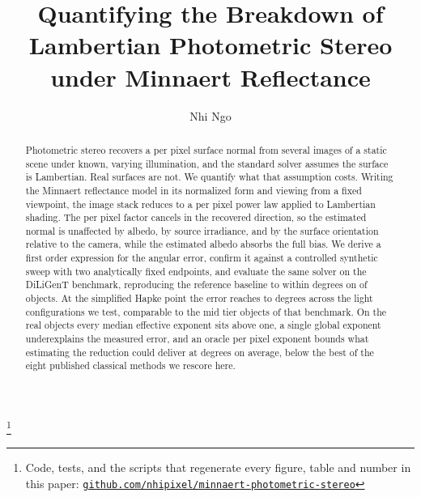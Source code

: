 \documentclass[10pt,twocolumn,letterpaper]{article}
\newcommand{\blfootnote}[1]{%
  \begingroup
  \renewcommand\thefootnote{}\footnote{#1}%
  \addtocounter{footnote}{-1}%
  \endgroup
}
\begin{document}
\title{Quantifying the Breakdown of Lambertian Photometric Stereo\\under Minnaert Reflectance}

\author{Nhi Ngo}

\maketitle

\blfootnote{Code, tests, and the scripts that regenerate every figure, table
and number in this paper:
\href{https://github.com/nhipixel/minnaert-photometric-stereo}%
     {\nolinkurl{github.com/nhipixel/minnaert-photometric-stereo}}}

\begin{abstract}
Photometric stereo recovers a per pixel surface normal from several images of a
static scene under known, varying illumination, and the standard solver assumes
the surface is Lambertian. Real surfaces are not. We quantify what that
assumption costs. Writing the Minnaert reflectance model in its normalized form
and viewing from a fixed viewpoint, the image stack reduces to a per pixel power
law applied to Lambertian shading. The per pixel factor cancels in the recovered
direction, so the estimated normal is unaffected by albedo, by source
irradiance, and by the surface orientation relative to the camera, while the
estimated albedo absorbs the full bias. We derive a first order expression for
the angular error, confirm it against a controlled synthetic sweep with two
analytically fixed endpoints, and evaluate the same solver on the DiLiGenT
benchmark, reproducing the reference baseline to within \diligentAgreeDelta{}
degrees on \diligentAgreeCount{} of \diligentObjects{} objects. At the
simplified Hapke point the error reaches \rigMin{} to \rigMax{} degrees across
the light configurations we test, comparable to the mid tier objects of that
benchmark. On the real objects every median effective exponent sits above
one, a single global exponent underexplains the measured error, and an oracle
per pixel exponent bounds what estimating the reduction could deliver at
\oraclePixAvg{} degrees on average, below the best of the eight published
classical methods we rescore here.
\end{abstract}
\end{document}
